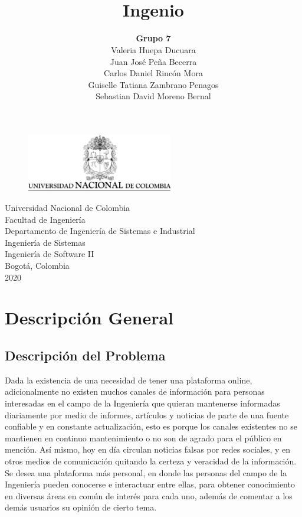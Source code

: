 \documentclass[a4paper,12 pt]{article}
\title{\LARGE \textbf{\\[0.5cm] Ingenio\\[2.5cm]}}
\author{\textbf{Grupo 7}\\[0.5cm]
        Valeria Huepa Ducuara\\
        Juan José Peña Becerra\\
        Carlos Daniel Rincón Mora\\
        Guiselle Tatiana Zambrano Penagos\\[2.5cm]
        Sebastian David Moreno Bernal\\[2.5cm]}
\date{}
\begin{document}
\newpage

\begin{figure}
    \centering
    \includegraphics[width=0.57\textwidth]{images/escudoUN.png}
\end{figure}
\maketitle 
\thispagestyle{empty}

\begin{center}
    \small Universidad Nacional de Colombia\\
    Facultad de Ingeniería\\
    Departamento de Ingeniería de Sistemas e Industrial\\
    Ingeniería de Sistemas\\
    Ingeniería de Software II\\
    Bogotá, Colombia\\
    2020
\end{center}
\newpage
\tableofcontents %
\thispagestyle{empty}

\newpage
\setcounter{page}{1}
\pagestyle{plain}

\section{Descripción General}


\subsection{Descripción del Problema}

Dada la existencia de una necesidad de tener una plataforma online,
adicionalmente no existen muchos canales de información para personas
interesadas en el campo de la Ingeniería que quieran mantenerse informadas
diariamente por medio de informes, artículos y noticias de parte de una fuente
confiable y en constante actualización, esto es porque los canales existentes no
se mantienen en continuo mantenimiento o no son de agrado para el público en
mención. Así mismo, hoy en día circulan noticias falsas por redes sociales, y en
otros medios de comunicación quitando la certeza y veracidad de la información.
Se desea una plataforma más personal, en donde las personas del campo de la
Ingeniería pueden conocerse e interactuar entre ellas, para obtener conocimiento
en diversas áreas en común de interés para cada uno, además de comentar a los
demás usuarios su opinión de cierto tema.\\
\end{document}
